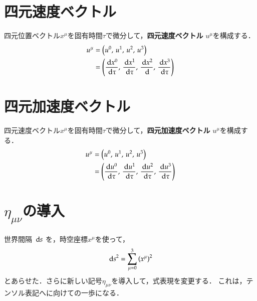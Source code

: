 \section{四元速度ベクトル}
    四元位置ベクトル${x}^{\mu}$を固有時間$\tau$で微分して，\textbf{四元速度ベクトル} ${u}^{\mu}$を構成する．
    \begin{align}
        {u}^{\mu} &= \left( u^{0}, \, u^{1}, \, u^{2}, \, u^{3} \right) \\
                &=\left(
                    \frac{{\,\mathrm{d} x^{0}}}{\,\mathrm{d} \tau}, \,
                    \frac{{\,\mathrm{d} x^{1}}}{\,\mathrm{d} \tau}, \,
                    \frac{{\,\mathrm{d} x^{2}}}{\,\mathrm{d} }, \,
                    \frac{{\,\mathrm{d} x^{3}}}{\,\mathrm{d} \tau}
                  \right)
    \end{align}

\section{四元加速度ベクトル}
    四元速度ベクトル${x}^{\mu}$を固有時間$\tau$で微分して，\textbf{四元加速度ベクトル} ${u}^{\mu}$を構成する．
    \begin{align}
        {u}^{\mu} &= \left( u^{0}, \, u^{1}, \, u^{2}, \, u^{3} \right) \\
            &=\left(
                \frac{{\,\mathrm{d} u^{0}}}{\,\mathrm{d} \tau}, \,
                \frac{{\,\mathrm{d} u^{1}}}{\,\mathrm{d} \tau}, \,
                \frac{{\,\mathrm{d} u^{2}}}{\,\mathrm{d} \tau}, \,
                \frac{{\,\mathrm{d} u^{3}}}{\,\mathrm{d} \tau}
              \right)
    \end{align}

\section{$\eta_{\mu\nu}$の導入}
    \begin{mycomment}
        世界間隔 $\,\mathrm{d} s$ を，時空座標$x^{\mu}$を使って，
            \[
                {\,\mathrm{d} s}^{2} = \sum_{\mu=0}^{3} \left({{x}^{\mu}}\right)^{2}
            \]
        とあらせた．さらに新しい記号$\eta_{\mu\nu}$を導入して，式表現を変更する．
        これは，テンソル表記へに向けての一歩になる．
    \end{mycomment}

